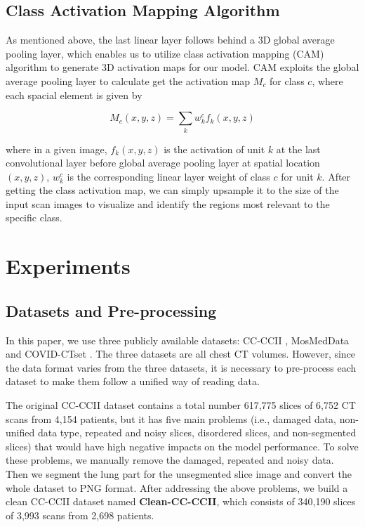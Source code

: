 \documentclass[letterpaper]{article}
\begin{document}
\subsection{Class Activation Mapping Algorithm}


As mentioned above, the last linear layer follows behind a 3D global average pooling layer, which enables us to utilize class activation mapping (CAM) algorithm to generate 3D activation maps for our model. CAM exploits the global average pooling layer to calculate get the activation map $M_c$ for class $c$, where each spacial element is given by

\begin{equation}
M_{c}(x, y, z)=\sum_{k} w_{k}^{c} f_{k}(x, y, z)
\label{eq:activation_map}
\end{equation}


\noindent  where in a given image, $f_{k}(x, y, z)$ is the activation  of unit $k$ at the last convolutional layer before global average pooling layer at spatial location $(x,y,z)$, $w_{k}^{c}$ is the corresponding linear layer weight of class $c$ for unit $k$. After getting the class activation map, we can simply upsample it to the size of the input scan images to visualize and identify the regions most relevant to the specific class.


\section{Experiments}
\label{section:exp}



\subsection{Datasets and Pre-processing}
\label{section:dataset}
In this paper, we use three publicly available datasets: CC-CCII \cite{cell_covid}, MosMedData \cite{mosmeddata} and COVID-CTset \cite{covid-ctset}. The three datasets are all chest CT volumes. However, since the data format varies from the three datasets, it is necessary to pre-process each dataset to make them follow a unified way of reading data.

The original CC-CCII dataset contains a total number 617,775 slices of 6,752 CT scans from 4,154 patients, but it has five main problems (i.e., damaged data, non-unified data type, repeated and noisy slices, disordered slices, and non-segmented slices) that would have high negative impacts on the model performance. To solve these problems, we manually remove the damaged, repeated and noisy data. Then we segment the lung part for the unsegmented slice image and convert the whole dataset to PNG format. After addressing the above problems, we build a clean CC-CCII dataset named \textbf{Clean-CC-CCII}, which consists of 340,190 slices of 3,993 scans from 2,698 patients.
\end{document}
